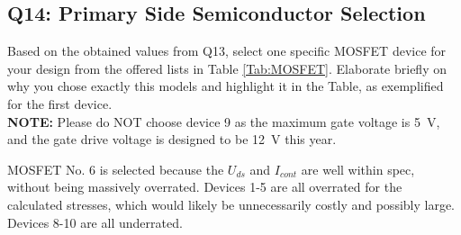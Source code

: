 \documentclass{PELsmallreport}
\begin{document}
 \quad {} \hfill{}

\subsection{Q14: Primary Side Semiconductor Selection} 
Based on the obtained values from Q13, select one specific MOSFET device for your design from the offered lists in Table \ref{Tab:MOSFET}. Elaborate briefly on why you chose exactly this models and highlight it in the Table, as exemplified for the first device. \\ 
\textbf{NOTE:} Please do NOT choose device 9 as the maximum gate voltage is \SI{5}{\volt}, and the gate drive voltage is designed to be \SI{12}{\volt} this year.

\begin{framed}
	\vspace{2em}
  MOSFET No. 6 is selected because the $U_{ds}$ and $I_{cont}$ are well within spec, without being massively overrated. Devices 1-5 are all overrated for the calculated stresses, which would likely be unnecessarily costly and possibly large. Devices 8-10 are all underrated.
  \vspace{2em}
\end{framed}

 \hfill{}
\end{document}
